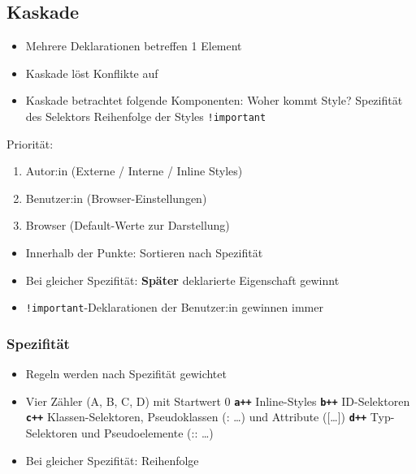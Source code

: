 \documentclass[a4paper, landscape, 8pt]{scrartcl}
\begin{document}
\begin{multicols*}{4}
        \subsection{Kaskade}
        \begin{itemize}
            \item Mehrere Deklarationen betreffen 1 Element
            \item Kaskade löst Konflikte auf
            \item Kaskade betrachtet folgende Komponenten:
            \subitem Woher kommt Style?
            \subitem Spezifität des Selektors
            \subitem Reihenfolge der Styles
            \subitem \texttt{!important}
        \end{itemize}
        Priorität:
        \begin{enumerate}
            \item Autor:in (Externe / Interne / Inline Styles)
            \item Benutzer:in (Browser-Einstellungen)
            \item Browser (Default-Werte zur Darstellung)
        \end{enumerate}

        \begin{itemize}
            \item Innerhalb der Punkte: Sortieren nach Spezifität
            \item Bei gleicher Spezifität: \textbf{Später} deklarierte Eigenschaft gewinnt
            \item \texttt{!important}-Deklarationen der Benutzer:in gewinnen immer
        \end{itemize}

        \subsubsection{Spezifität}
        \begin{itemize}
            \item Regeln werden nach Spezifität gewichtet
            \item Vier Zähler (A, B, C, D) mit Startwert 0
            \subitem \textbf{\texttt{a++}} Inline-Styles
            \subitem \textbf{\texttt{b++}} ID-Selektoren
            \subitem \textbf{\texttt{c++}} Klassen-Selektoren, Pseudoklassen (: \ldots) und Attribute ([\ldots])
            \subitem \textbf{\texttt{d++}} Typ-Selektoren und Pseudoelemente (:: \ldots)
            \item Bei gleicher Spezifität: Reihenfolge
        \end{itemize}


\end{multicols*}
\end{document}
